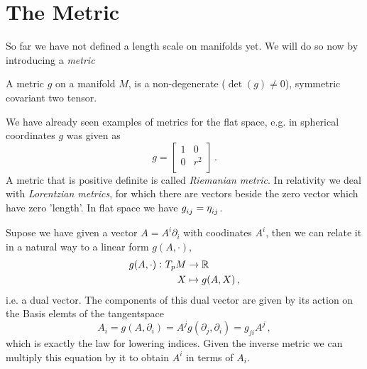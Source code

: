 \section{The Metric}
So far we have not defined a length scale on manifolds yet. We will do so now by
introducing a \emph{metric} 
\begin{definition}[Metric]
A metric $g$ on a manifold $M$, is a non-degenerate ($\det(g)\neq 0$), symmetric
covariant two tensor.
\end{definition}
We have already seen examples of metrics for the flat space, e.g. in spherical coordinates $g$ was given as
\begin{equation}
    g=
    \begin{bmatrix}
        1 & 0\\
        0 & r^2\\
    \end{bmatrix}\,.
\end{equation}
A metric that is positive definite is called \emph{Riemanian metric}. In
relativity we deal with \emph{Lorentzian metrics}, for which there are vectors
beside the zero vector which have zero 'length'. In flat space we have
$\tensor{g}{_i_j}=\tensor{\eta}{_i_j}$.
\begin{remark} Supose we have given a vector $A=A^i\partial_i$
with coodinates $A^i$, then we can relate it 
in a natural way to a linear form $g(A,\cdot)$,
\begin{equation}
\begin{split}
 g(A,\cdot)\,\colon T_pM &\to \mathbb{R}\\
 X &\mapsto g(A,X)\, ,
\end{split}
\end{equation}
i.e. a dual vector. The components of this dual vector are given by its action
on the Basis elemts of the tangentspace
\begin{equation}
A_i=g(A,\partial_i)=A^jg(\partial_j,\partial_i)=g_{ji}A^j\,,
\end{equation}
which is exactly the law for lowering indices. Given the inverse metric we can
multiply this equation by it to obtain $A^i$ in terms of $A_i$.
\end{remark}
